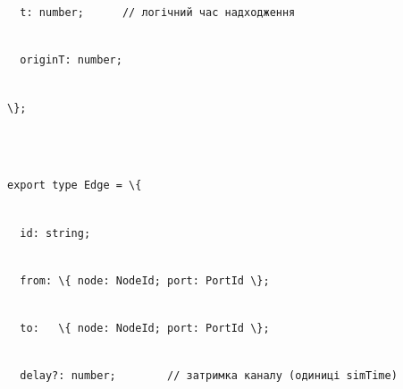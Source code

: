\documentclass[
]{article}
\newcommand{\passthrough}[1]{#1}
\begin{document}
\passthrough{\lstinline!  !}\passthrough{\lstinline!t:!}\passthrough{\lstinline! !}\passthrough{\lstinline!number;!}\passthrough{\lstinline!      !}\passthrough{\lstinline!//!}\passthrough{\lstinline! !}\passthrough{\lstinline!логічний!}\passthrough{\lstinline! !}\passthrough{\lstinline!час!}\passthrough{\lstinline! !}\passthrough{\lstinline!надходження!}\strut \\
\passthrough{\lstinline!  !}\passthrough{\lstinline!originT!}\passthrough{\lstinline!:!}\passthrough{\lstinline! !}\passthrough{\lstinline!number;!}\strut \\
\passthrough{\lstinline!\};!}\strut \\
\strut \\
\passthrough{\lstinline!export!}\passthrough{\lstinline! !}\passthrough{\lstinline!type!}\passthrough{\lstinline! !}\passthrough{\lstinline!Edge!}\passthrough{\lstinline! !}\passthrough{\lstinline!=!}\passthrough{\lstinline! !}\passthrough{\lstinline!\{!}\strut \\
\passthrough{\lstinline!  !}\passthrough{\lstinline!id:!}\passthrough{\lstinline! !}\passthrough{\lstinline!string;!}\strut \\
\passthrough{\lstinline!  !}\passthrough{\lstinline!from:!}\passthrough{\lstinline! !}\passthrough{\lstinline!\{!}\passthrough{\lstinline! !}\passthrough{\lstinline!node:!}\passthrough{\lstinline! !}\passthrough{\lstinline!NodeId!}\passthrough{\lstinline!;!}\passthrough{\lstinline! !}\passthrough{\lstinline!port:!}\passthrough{\lstinline! !}\passthrough{\lstinline!PortId!}\passthrough{\lstinline! !}\passthrough{\lstinline!\};!}\strut \\
\passthrough{\lstinline!  !}\passthrough{\lstinline!to:!}\passthrough{\lstinline!   !}\passthrough{\lstinline!\{!}\passthrough{\lstinline! !}\passthrough{\lstinline!node:!}\passthrough{\lstinline! !}\passthrough{\lstinline!NodeId!}\passthrough{\lstinline!;!}\passthrough{\lstinline! !}\passthrough{\lstinline!port:!}\passthrough{\lstinline! !}\passthrough{\lstinline!PortId!}\passthrough{\lstinline! !}\passthrough{\lstinline!\};!}\strut \\
\passthrough{\lstinline!  !}\passthrough{\lstinline!delay?:!}\passthrough{\lstinline! !}\passthrough{\lstinline!number;!}\passthrough{\lstinline!        !}\passthrough{\lstinline!//!}\passthrough{\lstinline! !}\passthrough{\lstinline!затримка!}\passthrough{\lstinline! !}\passthrough{\lstinline!каналу!}\passthrough{\lstinline! !}\passthrough{\lstinline!(!}\passthrough{\lstinline!одиниці!}\passthrough{\lstinline! !}\passthrough{\lstinline!simTime!}\passthrough{\lstinline!)!}\strut \\
\end{document}
